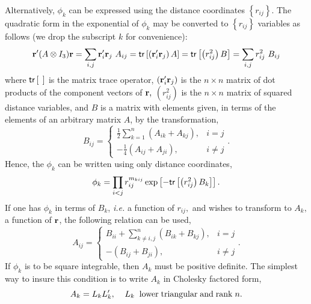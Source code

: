 Alternatively, $\phi _k$ can be expressed using the distance coordinates $%
\left\{ r_{ij}\right\} $. The quadratic form in the exponential of $\phi _k$
may be converted to $\left\{ r_{ij}\right\} $ variables as follows (we drop
the subscript $k$ for convenience):
\begin{equation}
{\bf r}^{\prime }(A\otimes I_3){\bf r} = \sum_{i,j}{\bf r}%
_i^{\prime }{\bf r}_j\,\,A_{ij} 
= {\sf tr}\left[ \left( {\bf r}_i^{\prime }{\bf r}_j\right) A\right] 
= {\sf tr}\left[ \left( r_{ij}^2\right) B\right]  
= \sum_{i,j}r_{ij}^2\,\,B_{ij}
\end{equation}
where ${\sf tr}\left[ \:\: {}\right] $ 
is the matrix trace operator, $\left( 
{\bf r}_i^{\prime }{\bf r}_j\right) $ is the $n\times n$ matrix of dot
products of the component vectors of ${\bf r},$ $\left( r_{ij}^2\right) $
is the $n\times n$ matrix of squared distance variables, and $B$ is a matrix
with elements given, in terms of the elements of an arbitrary matrix $A$, by
the transformation, 
\begin{equation}
B_{ij}=\left\{ 
\begin{array}{ll}
\frac 12\sum_{k=1}^{n}\left( A_{ik}+A_{kj}\right) , & i=j \\ 
-\frac 14\left( A_{ij}+A_{ji}\right) , & i\neq j
\end{array}
\right. .  \label{Btran}
\end{equation}
Hence, the $\phi _k$ can be written using only distance coordinates, 
\begin{equation}
\phi _k=\prod_{i<j}r_{ij}^{m_{kij}}\exp \left[ -{\sf tr}\left[ \left(
r_{ij}^2\right) B_k\right] \right] .
\end{equation}
If one has $\phi _k$ in terms of $B_k$, {\it i.e.} 
a function of $r_{ij},$ and
wishes to transform to $A_k,$ a function of ${\bf r}$, the following
relation can be used, 
\begin{equation}
A_{ij}=\left\{ 
\begin{array}{ll}
B_{ii}+\sum_{k\neq i,j}^{n}\left( B_{ik}+B_{kj}\right) , & i=j \\ 
-\left( B_{ij}+B_{ji}\right) , & i\neq j
\end{array}
\right. .  \label{Atran}
\end{equation}
If $\phi _k$ is to be square integrable, 
then $A_k$ must be positive definite. The simplest way to insure this
condition is to write $A_k$ in Cholesky factored form, 
\begin{equation}
A_k=L_kL_k^{\prime }, \; \; \; \;
L_k
{\rm \; \; lower  \; triangular \; and \;
rank \;}n.
\end{equation}

